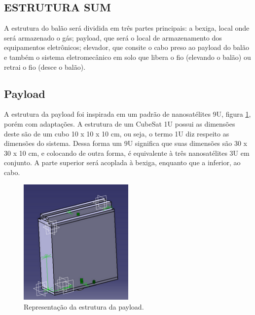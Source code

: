   
\subsection{ESTRUTURA SUM}

   A estrutura do balão será dividida em três partes principais: a bexiga, local onde será armazenado o gás; payload, que será o local de armazenamento dos equipamentos eletrônicos; elevador, que consite o cabo preso ao payload do balão e também o sistema eletromecânico em solo que libera o fio (elevando o balão) ou retrai o fio (desce o balão).

\subsection{Payload}
  
    A estrutura da payload foi inspirada em um padrão de nanosatélites 9U, figura \ref{img:payload}, porém com adaptações. A estrutura de um CubeSat 1U possui as dimensões deste são de um cubo 10 x 10 x 10 cm, ou seja, o termo 1U diz respeito as dimensões do sistema. Dessa forma um 9U significa que suas dimensões são 30 x 30 x 10 cm, e colocando de outra forma, é equivalente à três nanosatélites 3U em conjunto. A parte superior será acoplada à bexiga, enquanto que a inferior, ao cabo.

  \begin{figure}[H]
    \centering
    \includegraphics[width=0.5\textwidth]{figuras/payload}
    \caption{Representação da estrutura da payload. }
    \label{img:payload}
  \end{figure}

